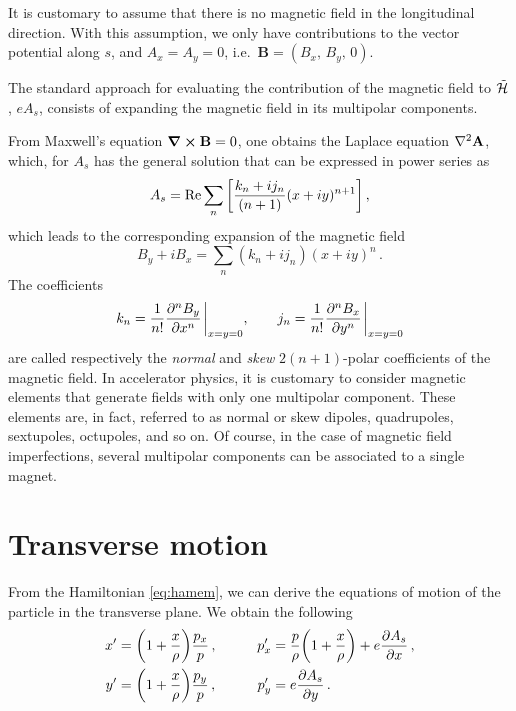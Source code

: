 It is customary to assume that there is no magnetic field in the longitudinal direction. With this assumption, we only have contributions to the vector potential along $s$, and $A_x=A_y=0$, i.e.\ $\mathbf{B}=(B_x,\,B_y,\,0)$.

The standard approach for evaluating the contribution of the magnetic field to $\tilde{\mathcal{H}}$, $eA_s$, consists of expanding the magnetic field in its multipolar components.

From Maxwell's equation $\curl\mathbf{B}=0$, one obtains the Laplace equation $\laplacian\mathbf{A}$, which, for $A_s$ has the general solution that can be expressed in power series as
%
\begin{equation}
	A_s = \Re\sum_{n}\qty[ \frac{k_n + ij_n}{(n+1)}(x+iy)^{n+1}]\, ,%
	\label{eq:as}
\end{equation}
%
which leads to the corresponding expansion of the magnetic field
\begin{equation}
	B_y + iB_x = \sum_n (k_n + ij_n) (x+iy)^n\,.
\end{equation}
%
The coefficients
\begin{equation}
	k_n = \frac{1}{n!} \pdv[n]{B_y}{x}\eval_{x=y=0}, \qquad 
	j_n = \frac{1}{n!} \pdv[n]{B_x}{y}\eval_{x=y=0} 
\end{equation}
%
are called respectively the \textit{normal} and \textit{skew} $2(n+1)$-polar coefficients of the magnetic field. In accelerator physics, it is customary to consider magnetic elements that generate fields with only one multipolar component. These elements are, in fact, referred to as normal or skew dipoles, quadrupoles, sextupoles, octupoles, and so on. Of course, in the case of magnetic field imperfections, several multipolar components can be associated to a single magnet.

%
\section{Transverse motion}
%

From the Hamiltonian \eqref{eq:hamem}, we can derive the equations of motion of the particle in the transverse plane. We obtain the following
%
\begin{equation}
    \begin{aligned}
        x' &= \qty(1+\frac{x}{\rho})\frac{p_x}{p}\,, &\qquad p_x' &= \frac{p}{\rho}\qty(1+\frac{x}{\rho}) + e\pdv{A_s}{x}\,,\\ %
        y' &= \qty(1+\frac{x}{\rho})\frac{p_y}{p}\,, &\qquad p_y' &= e\pdv{A_s}{y}\,.
    \end{aligned}
    \label{eq:ham_motion}
\end{equation}

